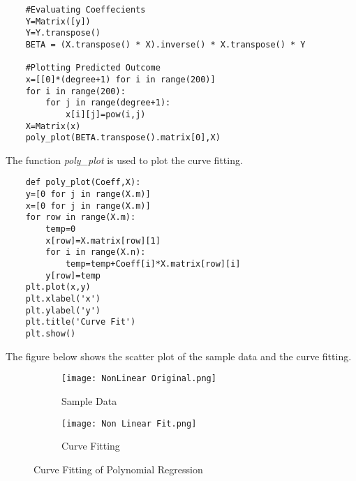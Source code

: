 \begin{lstlisting}
    #Evaluating Coeffecients
    Y=Matrix([y])
    Y=Y.transpose()
    BETA = (X.transpose() * X).inverse() * X.transpose() * Y

    #Plotting Predicted Outcome
    x=[[0]*(degree+1) for i in range(200)]
    for i in range(200):
        for j in range(degree+1):
            x[i][j]=pow(i,j)
    X=Matrix(x)
    poly_plot(BETA.transpose().matrix[0],X)
\end{lstlisting}
The function \textit{poly\_plot} is used to plot the curve fitting.
\begin{lstlisting}
    def poly_plot(Coeff,X):
    y=[0 for j in range(X.m)]
    x=[0 for j in range(X.m)]
    for row in range(X.m):
        temp=0
        x[row]=X.matrix[row][1]
        for i in range(X.n):
            temp=temp+Coeff[i]*X.matrix[row][i]
        y[row]=temp
    plt.plot(x,y)
    plt.xlabel('x')
    plt.ylabel('y')
    plt.title('Curve Fit')
    plt.show()
\end{lstlisting}
The figure below shows the scatter plot of the sample data and the curve fitting.
\begin{figure}[h!]
    \centering
    \begin{subfigure}{0.5\textwidth}
        \centering
        \texttt{[image: NonLinear Original.png]}
        \caption{Sample Data}
    \end{subfigure}
    \begin{subfigure}{0.5\textwidth}
        \centering
        \texttt{[image: Non Linear Fit.png]}
        \caption{Curve Fitting}
    \end{subfigure}
    \caption{Curve Fitting of Polynomial Regression}
\end{figure}